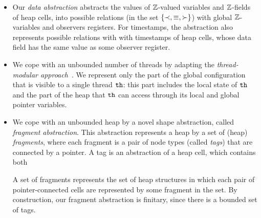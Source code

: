 \begin{itemize}
  \item
  Our {\em data abstraction} abstracts the values of ${\mathbb Z}$-valued variables
    and ${\mathbb Z}$-fields of heap cells, into possible relations
    (in the set $\left\{\prec,\equiv,\succ\right\}$) with global ${\mathbb Z}$-variables and
    observers registers. For timestamps, the abstraction also represents
    possible relations with with timestamps of heap cells, whose
    data field has  the same value as some observer register.
  \item
We cope with an unbounded number of threads by
adapting the {\em thread-modular approach}~\cite{BLMRS:cav08}.
We represent only the part of the global configuration that is visible to
a single thread ${\tt th}$: this part includes the local state of ${\tt th}$ and
the part of the heap that ${\tt th}$ can access through its local
and global pointer variables.
\item
  We cope with an unbounded heap by a novel shape abstraction, 
called {\em fragment abstraction}. This abstraction 
represents a heap by a set of (heap) {\em fragments}, where each fragment is
a pair of node types (called {\em tags}) that are connected by a pointer.
A tag is an abstraction of a heap cell, which contains both 
A set of fragments represents the set of heap structures in which each
pair of pointer-connected cells are represented by some fragment in the set.
By construction, our fragment abstraction is finitary, since there is
a bounded set of tags.
\end{itemize}
